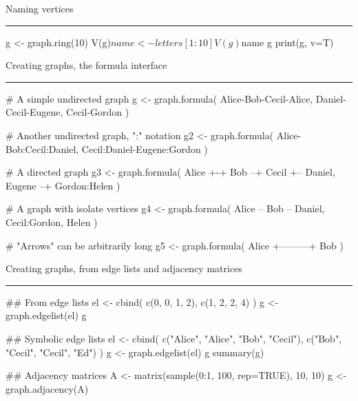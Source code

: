 \documentclass[landscape,fleqno]{foils}
\newcommand{\stitle}[1]{{\color{blue}\Large #1\par\vspace*{10pt}\hrule}}
\newenvironment{narrow}[2]{%
  \begin{list}{}{%
      \setlength{\topsep}{0pt}%
      \setlength{\leftmargin}{#1}%
      \setlength{\rightmargin}{#2}%
      \setlength{\listparindent}{\parindent}%
      \setlength{\itemindent}{\parindent}%
      \setlength{\parsep}{\parskip}}%
    \item[]}{\end{list}}
\begin{document}

\newpage
\stitle{Naming vertices}
\begin{narrow}{0cm}{15cm}
\begin{Myverb}
  g <- graph.ring(10)
  V(g)$name <- letters[1:10]
  V(g)$name
  g
  print(g, v=T)
\end{Myverb}
\end{narrow}

\newpage
\stitle{Creating graphs, the formula interface}
\begin{narrow}{0cm}{15cm}
\begin{Myverb}
  # A simple undirected graph
  g <- graph.formula( Alice-Bob-Cecil-Alice, 
       Daniel-Cecil-Eugene, Cecil-Gordon )
\end{Myverb}
\vspace*{-2cm} \pause
\begin{Myverb}
  # Another undirected graph, ":" notation
  g2 <- graph.formula( Alice-Bob:Cecil:Daniel, 
       Cecil:Daniel-Eugene:Gordon )
\end{Myverb}
\vspace*{-2cm} \pause
\begin{Myverb}
  # A directed graph
  g3 <- graph.formula( Alice +-+ Bob --+ Cecil 
      +-- Daniel, Eugene --+ Gordon:Helen )
\end{Myverb}
\vspace*{-2cm} \pause
\begin{Myverb}
  # A graph with isolate vertices
  g4 <- graph.formula( Alice -- Bob -- Daniel, 
      Cecil:Gordon, Helen )
\end{Myverb}
\vspace*{-2cm} \pause
\begin{Myverb}
  # "Arrows" can be arbitrarily long
  g5 <- graph.formula( Alice +---------+ Bob )
\end{Myverb}
\end{narrow}

\newpage
\stitle{Creating graphs, from edge lists and adjacency matrices}
\begin{Myverb}
  ## From edge lists
  el <- cbind( c(0, 0, 1, 2),
               c(1, 2, 2, 4) )
  g <- graph.edgelist(el)
  g

  ## Symbolic edge lists
  el <- cbind( c("Alice", "Alice", "Bob",   "Cecil"),
               c("Bob",   "Cecil", "Cecil", "Ed") )
  g <- graph.edgelist(el)
  g
  summary(g)

  ## Adjacency matrices
  A <- matrix(sample(0:1, 100, rep=TRUE), 10, 10)
  g <- graph.adjacency(A)
\end{Myverb}
\end{document}
